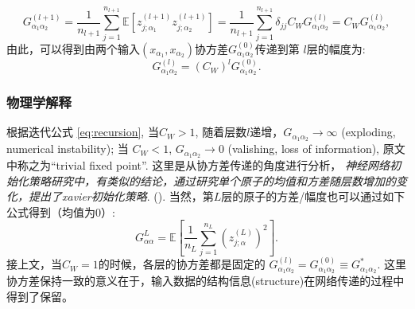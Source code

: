 \begin{equation}
    G_{\alpha_1\alpha_2}^{(l+1)} = 
        \frac{1}{n_{l+1}} \sum_{j=1}^{n_{l+1}} \mathbb{E}[z_{j;\alpha_1}^{(l+1)}z_{j;\alpha_2}^{(l+1)}] 
        = \frac{1}{n_{l+1}}\sum_{j=1}^{n_{l+1}} \delta_{jj}C_W G_{\alpha_1\alpha_2}^{(l)}
        = C_W G_{\alpha_1\alpha_2}^{(l)},
\end{equation}
由此，可以得到由两个输入$(x_{\alpha_1}, x_{\alpha_2})$协方差$G_{\alpha_1\alpha_2}^{(0)}$传递到第
$l$层的幅度为:
\begin{equation}
    G_{\alpha_1\alpha_2}^{(l)} = (C_W)^l G_{\alpha_1\alpha_2}^{(0)}.
    \label{eq:recursion}
\end{equation} 

\subsubsection{物理学解释}
根据迭代公式 \ref{eq:recursion}, 当$C_W > 1$, 随着层数$l$递增，$G_{\alpha_1\alpha_2} \to \infty$ (exploding,
numerical instability); 当 $C_W < 1$, $G_{\alpha_1\alpha_2} \to 0$ (valishing, loss of information), 
原文中称之为``trivial fixed point''. 这里是从协方差传递的角度进行分析， 
\emph{神经网络初始化策略研究中，有类似的结论，通过研究单个原子的均值和方差随层数增加的变化，提出了xavier初始化策略}.
(). 当然，第$L$层的原子的方差/幅度也可以通过如下公式得到（均值为$0$）:
\begin{equation*}
    G_{\alpha\alpha}^L = \mathbb{E} [\frac{1}{n_L} \sum_{j=1}^{n_L}(z_{j;\alpha}^{(L)})^2].
\end{equation*}
接上文，当$C_W=1$的时候，各层的协方差都是固定的 
$G_{\alpha_1\alpha_2}^{(l)} = G_{\alpha_1\alpha_2}^{(0)} \equiv G_{\alpha_1\alpha_2}^*$. 这里
协方差保持一致的意义在于，输入数据的结构信息(structure)在网络传递的过程中得到了保留。


